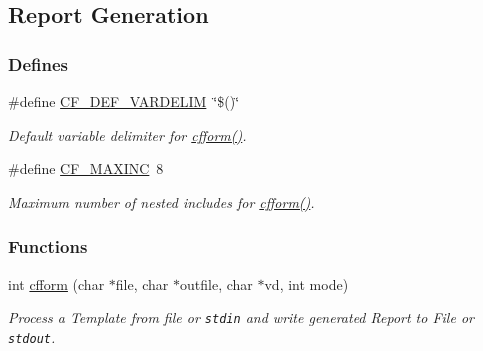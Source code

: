 \hypertarget{group__report__generation}{
\subsection{Report Generation}
\label{group__report__generation}
}
\subsubsection*{Defines}
\begin{CompactItemize}
\item 
\hypertarget{group__report__generation_g5547641c939fd4d071e9aeaa7c956cac}{
\#define \hyperlink{group__report__generation_g5547641c939fd4d071e9aeaa7c956cac}{CF\_\-DEF\_\-VARDELIM}~\char`\"{}\$()\char`\"{}}
\label{group__report__generation_g5547641c939fd4d071e9aeaa7c956cac}

\begin{CompactList}\small\item\em Default variable delimiter for \hyperlink{group__report__generation_g2f8350e7d032c87b2a0e1cb6149a85ec}{cfform()}. \item\end{CompactList}\item 
\hypertarget{group__report__generation_g7b96ba1ca10909659d50eabb8b5af611}{
\#define \hyperlink{group__report__generation_g7b96ba1ca10909659d50eabb8b5af611}{CF\_\-MAXINC}~8}
\label{group__report__generation_g7b96ba1ca10909659d50eabb8b5af611}

\begin{CompactList}\small\item\em Maximum number of nested includes for \hyperlink{group__report__generation_g2f8350e7d032c87b2a0e1cb6149a85ec}{cfform()}. \item\end{CompactList}\end{CompactItemize}
\subsubsection*{Functions}
\begin{CompactItemize}
\item 
int \hyperlink{group__report__generation_g2f8350e7d032c87b2a0e1cb6149a85ec}{cfform} (char $\ast$file, char $\ast$outfile, char $\ast$vd, int mode)
\begin{CompactList}\small\item\em Process a Template from file or {\tt stdin} and write generated Report to File or {\tt stdout}. \item\end{CompactList}\end{CompactItemize}


